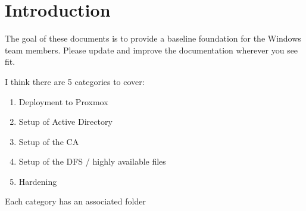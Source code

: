 \documentclass{article}
\begin{document}
\graphicspath{ {./Images/} }
\tableofcontents

\section{Introduction}
The goal of these documents is to provide a baseline foundation for the Windows team members.
Please update and improve the documentation wherever you see fit.

I think there are 5 categories to cover:

\begin{enumerate}
        \item Deployment to Proxmox
        \item Setup of Active Directory
        \item Setup of the CA
        \item Setup of the DFS / highly available files
        \item Hardening
\end{enumerate}

Each category has an associated folder
\end{document}
